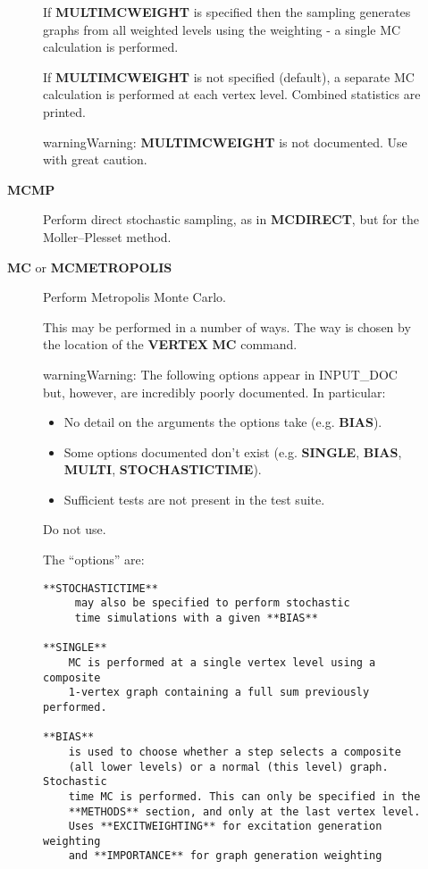 \documentclass[openany,a4paper,10pt,english]{manual}
\begin{document}
\begin{description}
\begin{description}
If \textbf{MULTIMCWEIGHT} is specified then
the sampling generates graphs from all weighted levels using
the weighting - a single MC calculation is performed.

If \textbf{MULTIMCWEIGHT} is not specified (default), a separate
MC calculation is performed at each vertex level.  Combined
statistics are printed.

\begin{notice}{warning}{Warning:}
\textbf{MULTIMCWEIGHT} is not documented.  Use with great caution.
\end{notice}

\item[\textbf{MCMP}] \leavevmode
Perform direct stochastic sampling, as in \textbf{MCDIRECT},
but for the Moller--Plesset method.

\item[\textbf{MC} or \textbf{MCMETROPOLIS}] \leavevmode
Perform Metropolis Monte Carlo.

This may be performed in a number of ways. The way is
chosen by the location of the \textbf{VERTEX} \textbf{MC} command.

\begin{notice}{warning}{Warning:}
The following options appear in INPUT\_DOC but, however, are incredibly
poorly documented.  In particular:
\begin{itemize}
\item {} 
No detail on the arguments the options take (e.g. \textbf{BIAS}).

\item {} 
Some options documented don't exist (e.g. \textbf{SINGLE}, \textbf{BIAS}, \textbf{MULTI}, \textbf{STOCHASTICTIME}).

\item {} 
Sufficient tests are not present in the test suite.

\end{itemize}

Do not use.

The ``options'' are:

\begin{Verbatim}[commandchars=@\[\]]
 **STOCHASTICTIME**
     may also be specified to perform stochastic
     time simulations with a given **BIAS**

**SINGLE**
    MC is performed at a single vertex level using a composite
    1-vertex graph containing a full sum previously performed.

**BIAS**
    is used to choose whether a step selects a composite
    (all lower levels) or a normal (this level) graph.  Stochastic
    time MC is performed. This can only be specified in the
    **METHODS** section, and only at the last vertex level.
    Uses **EXCITWEIGHTING** for excitation generation weighting
    and **IMPORTANCE** for graph generation weighting


\end{Verbatim}
\end{notice}
\end{description}
\end{description}
\end{document}
